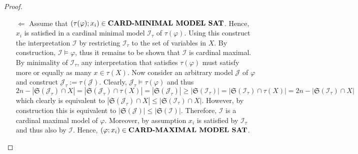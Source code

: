 \documentclass [11pt]{article}
\newcommand{\MINCARDSAT}{\mbox{\bf CARD-MINIMAL MODEL SAT}}
\newcommand{\MAXCARDSAT}{\mbox{\bf CARD-MAXIMAL MODEL SAT}}
\begin{document}
\begin{proof}
\begin{itemize}
\item[$\Leftarrow$] Assume that $(\tau(\varphi); x_i) \in \MINCARDSAT$. Hence, $x_i$ is satisfied in a cardinal minimal model $\mathcal{I}_{\tau}$ of $\tau(\varphi)$. Using this construct the interpretation $\mathcal{I}$ by restricting $\mathcal{I}_{\tau}$ to the set of variables in $X$. By construction, $\mathcal{I} \models \varphi$, thus it remains to be shown that $\mathcal{I}$ is cardinal maximal.
By minimality of $\mathcal{I}_{\tau}$, any interpretation that satisfies $\tau(\varphi)$ must satisfy more or equally as many $x \in \tau(X)$. Now consider an arbitrary model $\mathcal{J}$ of $\varphi$ and construct $\mathcal{J}_{\tau}:=\tau(\mathcal{J})$. Clearly, $\mathcal{J}_{\tau} \models \tau(\varphi)$ and thus
\begin{equation*}
2n-|\mathfrak{S}(\mathcal{J}_{\tau}) \cap X| =|\mathfrak{S}(\mathcal{J}_{\tau}) \cap \tau(X)|=|\mathfrak{S}(\mathcal{J}_{\tau})|   \geq |\mathfrak{S}(\mathcal{I}_{\tau})|  =|\mathfrak{S}(\mathcal{I}_{\tau}) \cap \tau(X) | = 2n-|\mathfrak{S}(\mathcal{I}_{\tau}) \cap X|
\end{equation*}
which clearly is equivalent to $|\mathfrak{S}(\mathcal{J}_{\tau}) \cap X| \leq |\mathfrak{S}(\mathcal{I}_{\tau}) \cap X|$. However, by construction this is equivalent to $|\mathfrak{S}(\mathcal{J}) | \leq |\mathfrak{S}(\mathcal{I}) |$.
Therefore, $\mathcal{I}$ is a cardinal maximal model of $\varphi$. Moreover, by assumption $x_i$ is satisfied by $\mathcal{I}_{\tau}$ and thus also by $\mathcal{I}$. Hence,  $(\varphi;x_i) \in \MAXCARDSAT$.

%
\end{itemize}

\end{proof}
\end{document}
